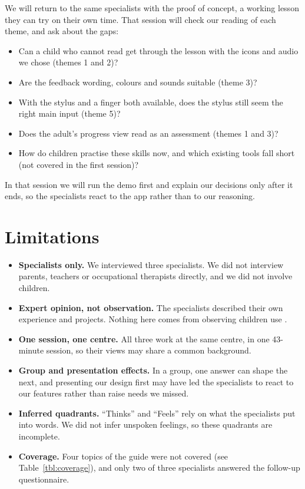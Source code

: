 \documentclass{article}
\begin{document}
We will return to the same specialists with the proof of concept, a working
lesson they can try on their own time. That session will check our reading of
each theme, and ask about the gaps:
\begin{itemize}
\item Can a child who cannot read get through the lesson with the icons and
  audio we chose (themes 1 and 2)?
\item Are the feedback wording, colours and sounds suitable (theme 3)?
\item With the stylus and a finger both available, does the stylus still seem
  the right main input (theme 5)?
\item Does the adult's progress view read as an assessment (themes 1 and 3)?
\item How do children practise these skills now, and which existing tools fall
  short (not covered in the first session)?
\end{itemize}
In that session we will run the demo first and explain our decisions only
after it ends, so the specialists react to the app rather than to our
reasoning.

\section{Limitations}

\begin{itemize}
\item \textbf{Specialists only.} We interviewed three specialists. We did not
  interview parents, teachers or occupational therapists directly, and we did
  not involve children.
\item \textbf{Expert opinion, not observation.} The specialists described
  their own experience and projects. Nothing here comes from observing
  children use \progname{}.
\item \textbf{One session, one centre.} All three work at the same centre, in
  one 43-minute session, so their views may share a common background.
\item \textbf{Group and presentation effects.} In a group, one answer can
  shape the next, and presenting our design first may have led the
  specialists to react to our features rather than raise needs we missed.
\item \textbf{Inferred quadrants.} ``Thinks'' and ``Feels'' rely on what the
  specialists put into words. We did not infer unspoken feelings, so these
  quadrants are incomplete.
\item \textbf{Coverage.} Four topics of the guide were not covered (see
  Table~\ref{tbl:coverage}), and only two of three specialists answered the
  follow-up questionnaire.
\end{itemize}
\end{document}
